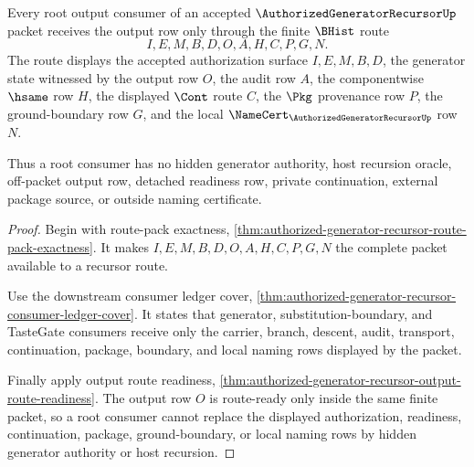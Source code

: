 \begin{theorem}
\label{thm:authorized-generator-recursor-root-output-consumer-triad}
Every root output consumer of an accepted $\AuthorizedGeneratorRecursorUp$
packet receives the output row only through the finite $\BHist$ route
$$
I,E,M,B,D,O,A,H,C,P,G,N.
$$
The route displays the accepted authorization surface $I,E,M,B,D$, the
generator state witnessed by the output row $O$, the audit row $A$, the
componentwise $\hsame$ row $H$, the displayed $\Cont$ route $C$, the $\Pkg$
provenance row $P$, the ground-boundary row $G$, and the local
$\NameCert_{\AuthorizedGeneratorRecursorUp}$ row $N$.

Thus a root consumer has no hidden generator authority, host recursion oracle,
off-packet output row, detached readiness row, private continuation, external
package source, or outside naming certificate.
\end{theorem}
\begin{proof}
Begin with route-pack exactness,
\autoref{thm:authorized-generator-recursor-route-pack-exactness}. It makes
$I,E,M,B,D,O,A,H,C,P,G,N$ the complete packet available to a recursor route.

Use the downstream consumer ledger cover,
\autoref{thm:authorized-generator-recursor-consumer-ledger-cover}. It states
that generator, substitution-boundary, and TasteGate consumers receive only
the carrier, branch, descent, audit, transport, continuation, package,
boundary, and local naming rows displayed by the packet.

Finally apply output route readiness,
\autoref{thm:authorized-generator-recursor-output-route-readiness}. The output
row $O$ is route-ready only inside the same finite packet, so a root consumer
cannot replace the displayed authorization, readiness, continuation, package,
ground-boundary, or local naming rows by hidden generator authority or host
recursion.
\end{proof}


